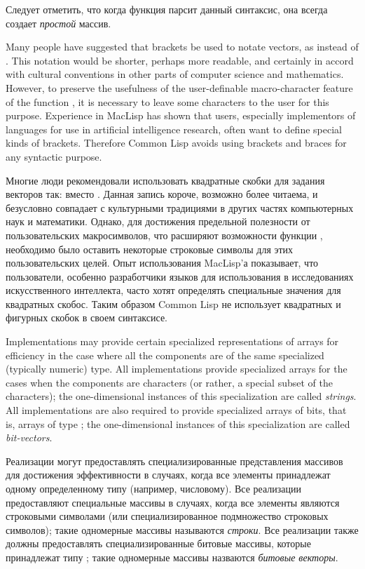 Следует отметить, что когда функция  парсит данный синтаксис, она
всегда создает \emph{простой} массив.

\beforenoterule
\begin{rationale}
Many people have suggested that brackets be used
to notate vectors, as 
instead of .  This notation
would be shorter, perhaps more readable, and certainly in accord with
cultural conventions in other parts of computer science and mathematics.
However, to preserve the usefulness of the user-definable macro-character
feature of the function , it is necessary to leave some
characters to the user for this purpose.  Experience in MacLisp has
shown that users, especially implementors of languages for use
in artificial intelligence research, often want
to define special kinds of brackets.  Therefore Common Lisp avoids using
brackets and braces for any syntactic purpose.

Многие люди рекомендовали использовать квадратные скобки для задания векторов
так:  вместо . Данная запись
короче, возможно более читаема, и безусловно совпадает с культурными традициями
в других частях компьютерных наук и математики. Однако, для достижения
предельной полезности от пользовательских макросимволов, что расширяют
возможности функции , необходимо было оставить некоторые строковые
символы для этих пользовательских целей. Опыт использования MacLisp'а
показывает, что пользователи, особенно разработчики языков для использования в
исследованиях искусственного интеллекта, часто хотят определять специальные
значения для квадратных скобос. Таким образом Common Lisp не использует
квадратных и фигурных скобок в своем синтаксисе.
\end{rationale}
\afternoterule

Implementations may provide certain specialized representations of
arrays for efficiency in the case where all the components are of
the same specialized (typically numeric) type.  All implementations
provide specialized arrays for the cases when the components
are characters (or rather, a special subset of the characters);
the one-dimensional instances of
this specialization are called \emph{strings}.
All implementations are also required to provide specialized arrays
of bits, that is, arrays of type ;
the one-dimensional instances of
this specialization are called \emph{bit-vectors}.

Реализации могут предоставлять специализированные представления массивов для
достижения эффективности в случаях, когда все элементы принадлежат одному
определенному типу (например, числовому). Все реализации предоставляют
специальные массивы в случаях, когда все элементы являются строковыми символами
(или специализированное подмножество строковых символов);
такие одномерные массивы называются \emph{строки}.
Все реализации также должны предоставлять специализированные битовые массивы,
которые принадлежат типу ;
такие одномерные массивы назваются \emph{битовые векторы}.

